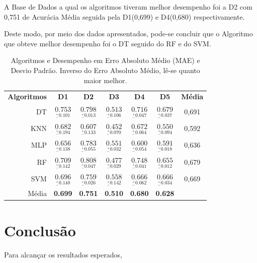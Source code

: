 \documentclass[12pt]{article}
\begin{document}
A Base de Dados a qual os algoritmos tiveram melhor desempenho foi a D2 com 0,751 de Acurácia Média seguida pela D1(0,699) e  D4(0,680) respectivamente. 

Deste modo, por meio dos dados apresentados, pode-se concluir que o Algoritmo que obteve melhor desempenho foi o DT seguido do RF e do SVM. 

\begin{table}[h!]
  \begin{center}
    \caption{Algoritmos e Desempenho em Erro Absoluto Médio (MAE) e Desvio Padrão. Inverso do Erro Absoluto Médio, lê-se quanto maior melhor. }
    \label{tab_desempenho}
    \begin{tabular}{r|c|c|c|c|c|c}
      \textbf{Algoritmos} & \textbf{D1}                                    & \textbf{D2}                                    & \textbf{D3}                                    & \textbf{D4}                                     & \textbf{D5}    & \textbf{Média }                               \\
      DT                  & \( \underset{_{-}^{+}\textrm{0.101}}{0.753} \) & \( \underset{_{-}^{+}\textrm{0.013}}{0.798} \) & \( \underset{_{-}^{+}\textrm{0.106}}{0.513} \) & \( \underset{_{-}^{+}\textrm{0.047}}{0.716} \)  & \( \underset{_{-}^{+}\textrm{0.037}}{0.679} \) & 0,691 \\ \hline
      KNN                 & \( \underset{_{-}^{+}\textrm{0.194}}{0.682} \) & \( \underset{_{-}^{+}\textrm{0.133}}{0.607} \) & \( \underset{_{-}^{+}\textrm{0.070}}{0.452} \) & \( \underset{_{-}^{+}\textrm{0.064}}{0.672} \)  & \( \underset{_{-}^{+}\textrm{0.094}}{0.550 } \) & 0,592 \\ \hline
      MLP                 & \( \underset{_{-}^{+}\textrm{0.138}}{0.656} \) & \( \underset{_{-}^{+}\textrm{0.055}}{0.783} \) & \( \underset{_{-}^{+}\textrm{0.032}}{0.551} \) & \( \underset{_{-}^{+}\textrm{0.054}}{0.600} \)  & \( \underset{_{-}^{+}\textrm{0.018}}{0.591} \) & 0,636 \\ \hline
      RF                  & \( \underset{_{-}^{+}\textrm{0.142}}{0.709} \) & \( \underset{_{-}^{+}\textrm{0.047}}{0.808} \) & \( \underset{_{-}^{+}\textrm{0.029}}{0.477} \) & \( \underset{_{-}^{+}\textrm{0.041}}{0.748} \)  & \( \underset{_{-}^{+}\textrm{0.012}}{0.655} \) & 0,679 \\ \hline
      SVM                 & \( \underset{_{-}^{+}\textrm{0.140}}{0.696} \) & \( \underset{_{-}^{+}\textrm{0.026}}{0.759} \) & \( \underset{_{-}^{+}\textrm{0.142}}{0.558} \) & \( \underset{_{-}^{+}\textrm{0.062}}{0.666 } \) & \( \underset{_{-}^{+}\textrm{0.034}}{0.666} \) & 0,669  \\ \hline
      Média               & \textbf{0.699}  & \textbf{0.751}  & \textbf{0.510}  & \textbf{0.680}  & \textbf{0.628}  & \\ \hline
    \end{tabular}
  \end{center}
\end{table}



\section{Conclusão}\label{sec:figs}

Para alcançar os resultados esperados, 




\end{document}
